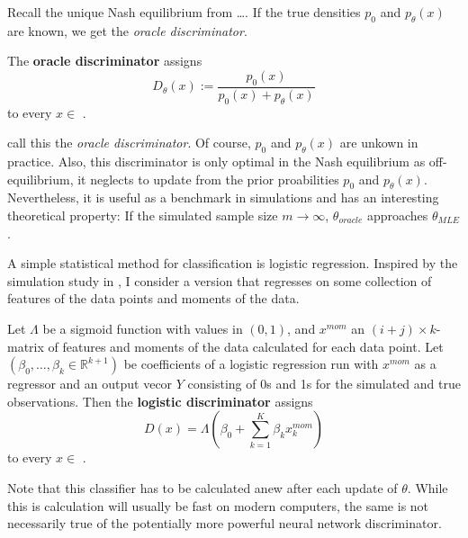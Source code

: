 Recall the unique Nash equilibrium from \dots.
If the true densities $p_0$ and $p_\theta(x)$ are known, we get the \textit{oracle discriminator}. %

\begin{definition}
    The \textbf{oracle discriminator} assigns
    \begin{equation}
        D_\theta(x):=\frac{p_0(x)}{p_0(x)+p_\theta(x)} %
    \end{equation}
    to every $x \in$ . %
\end{definition}

\textcite{kaji2023adversarial} call this the \textit{oracle discriminator}.
Of course, $p_0$ and $p_\theta(x)$ are unkown in practice.
Also, this discriminator is only optimal in the Nash equilibrium
as off-equilibrium, it neglects to update from the prior proabilities $p_0$ and $p_\theta(x)$.  %
Nevertheless, it is useful as a benchmark in simulations and has an interesting theoretical property:
If the simulated sample size $m \rightarrow \infty$, $\theta_{oracle}$ approaches $\theta_{MLE}$. %

A simple statistical method for classification is logistic regression.
Inspired by the simulation study in \textcite{kaji2023adversarial}, I consider a version that regresses on some collection of features of the data points and moments of the data.

\begin{definition}
    Let $\Lambda$ be a sigmoid function with values in $(0,1)$, and $x^{mom}$ an $(i+j)\times k$-matrix of features and moments of the data calculated for each data point.
    Let $(\beta_0, \dots,\beta_k \in \mathbb{R}^{k+1})$ be coefficients of a logistic regression run with $x^{mom}$ as a regressor and an output vecor $Y$ consisting of 0s and 1s for the simulated and true observations. %
    Then the \textbf{logistic discriminator} assigns
    \begin{equation}
        D(x) = \Lambda(\beta_{0} + \sum_{k=1}^{K}\beta_{k} x_{k}^{mom}) %
    \end{equation}
    to every $x \in$ . %
\end{definition}

Note that this classifier has to be calculated anew after each update of $\theta$.
While this is calculation will usually be fast on modern computers, the same is not necessarily true of the potentially more powerful neural network discriminator.

